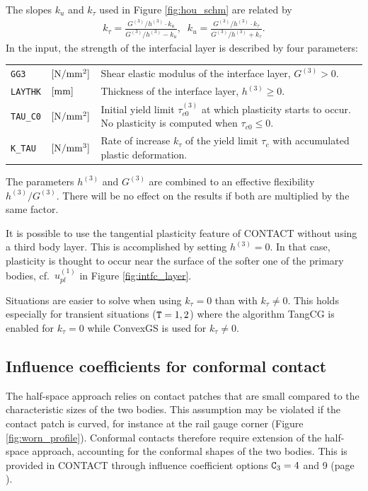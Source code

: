 \documentclass[12pt]{report}
\newenvironment{inputvars}{\vspace{0.4\baselineskip}%

\begin{tabular}{>{\raggedright}p{22mm}p{19mm}p{113mm}}}{
\end{tabular}

}
\newcommand{\inpvar}[3]{{\small\tt #1} & $#2$ & #3 \\[1ex]}
\begin{document}
The slopes $k_u$ and $k_\tau$ used in Figure \ref{fig:hou_schm} are
related by
\begin{eqnarray}
    k_\tau = \frac{G^{(3)}/h^{(3)} \cdot k_u}{G^{(3)}/h^{(3)}-k_u} , \;\;
    k_u = \frac{G^{(3)}/h^{(3)} \cdot k_\tau}{G^{(3)}/h^{(3)}+k_\tau} .
                                                        \label{eq:k_tau}
\end{eqnarray}
In the input, the strength of the interfacial layer is described by four
parameters:
\begin{inputvars}
\inpvar{GG3}{\bunit{N/mm^2}}{Shear elastic modulus of the interface layer,
        $G^{(3)} > 0$.}
\inpvar{LAYTHK}{\bunit{mm}}{Thickness of the interface layer, $h^{(3)}\ge 0$.}
\inpvar{TAU\_C0}{\bunit{N/mm^2}}{Initial yield limit $\tau_{c0}^{(3)}$ at which
        plasticity starts to occur. No plasticity is computed when
        $\tau_{c0}\le 0$.}
\inpvar{K\_TAU}{\bunit{N/mm^3}}{Rate of increase $k_\tau$ of the yield limit
        $\tau_c$ with accumulated plastic deformation.}
\end{inputvars}
The parameters $h^{(3)}$ and $G^{(3)}$ are combined to an effective
flexibility $h^{(3)}/G^{(3)}$. There will be no effect on the results if
both are multiplied by the same factor.

It is possible to use the tangential plasticity feature of CONTACT without
using a third body layer. This is accomplished by setting $h^{(3)}=0$.
In that case, plasticity is thought to occur near the surface of the softer
one of the primary bodies, cf.\ $u_{pl}^{(1)}$ in Figure \ref{fig:intfc_layer}.

Situations are easier to solve when using $k_\tau=0$ than with $k_\tau\neq
0$. This holds especially for transient situations (${\tt T}=1,2$) where
the algorithm TangCG is enabled for $k_\tau=0$ while ConvexGS is used for
$k_\tau\neq 0$.

\subsection{Influence coefficients for conformal contact}
\label{sec:num_infl}

The half-space approach relies on contact patches that are small compared
to the characteristic sizes of the two bodies. This assumption may be
violated if the contact patch is curved, for instance at the rail gauge
corner (Figure \ref{fig:worn_profile}). Conformal contacts therefore
require extension of the half-space approach, accounting for the conformal
shapes of the two bodies. This is provided in CONTACT through influence
coefficient options ${\tt C}_3=4$ and 9 (page \pageref{c3-digit}).
\end{document}
